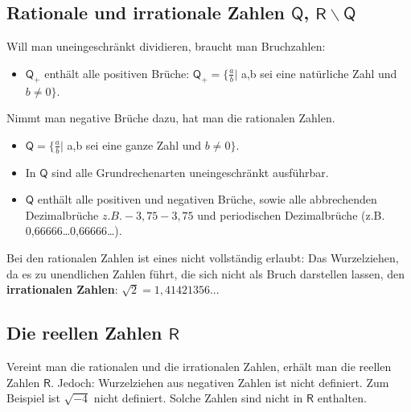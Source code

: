 \documentclass[letterpaper, titlepage]{article}
\begin{document}
\subsection{Rationale und irrationale Zahlen $\mathsf{Q}$, $\mathsf{R \backslash Q}$}\label{Rationale und irrationale Zahlen}
Will man uneingeschränkt dividieren, braucht man Bruchzahlen: 
\begin{itemize}
    \item $\mathsf{Q}_+$ enthält alle positiven Brüche: $\mathsf{Q}_+ = \{\frac{a}{b} \vert$ a,b sei eine natürliche Zahl und $b \neq 0\}$.
\end{itemize} 
Nimmt man negative Brüche dazu, hat man die rationalen Zahlen.
\begin{itemize}
    \item $\mathsf{Q} = \{\frac{a}{b} \vert$ a,b sei eine ganze Zahl und $b \neq 0\}$.
    \item In $\mathsf{Q}$ sind alle Grundrechenarten uneingeschränkt ausführbar.
    \item $\mathsf{Q}$ enthält alle positiven und negativen Brüche, sowie alle abbrechenden Dezimalbrüche \(z.B. -3,75-3,75\) und periodischen Dezimalbrüche (z.B. 0,66666…0,66666…).
\end{itemize}
Bei den rationalen Zahlen ist eines nicht vollständig erlaubt: Das Wurzelziehen, da es zu unendlichen Zahlen führt, die sich nicht als Bruch darstellen lassen, den \textbf{irrationalen Zahlen}: $\sqrt{2}=1,41421356..$. 

\subsection{Die reellen Zahlen $\mathsf{R}$}\label{Die reellen Zahlen}
Vereint man die rationalen und die irrationalen Zahlen, erhält man die reellen Zahlen $\mathsf{R}$. Jedoch: Wurzelziehen aus negativen Zahlen ist nicht definiert. Zum Beispiel ist $\sqrt{-4}$ nicht definiert. Solche Zahlen sind nicht in $\mathsf{R}$ enthalten.
\end{document}
